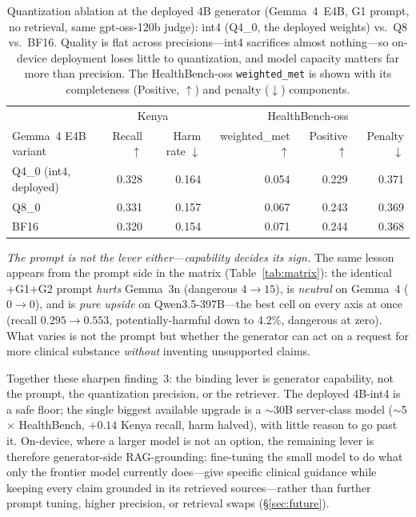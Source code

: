 \begin{table}[t]
\caption{Quantization ablation at the deployed 4B generator (Gemma~4~E4B, G1
prompt, no retrieval, same gpt-oss-120b judge): int4 (Q4\_0, the deployed
weights) vs.\ Q8 vs.\ BF16. Quality is flat across precisions---int4
sacrifices almost nothing---so on-device deployment loses little to
quantization, and model capacity matters far more than precision. The
HealthBench-oss \texttt{weighted\_met} is shown with its completeness
(Positive, $\uparrow$) and penalty ($\downarrow$) components.}
\label{tab:precision}
\centering
\small
\begin{tabular}{@{}lrrrrr@{}}
\toprule
 & \multicolumn{2}{c}{Kenya} & \multicolumn{3}{c}{HealthBench-oss} \\
\cmidrule(lr){2-3}\cmidrule(lr){4-6}
Gemma~4 E4B variant & \makecell{Recall\\$\uparrow$} & \makecell{Harm rate\\$\downarrow$} & \makecell{weighted\_met\\$\uparrow$} & \makecell{Positive\\$\uparrow$} & \makecell{Penalty\\$\downarrow$} \\
\midrule
Q4\_0 (int4, deployed) & 0.328 & 0.164 & 0.054 & 0.229 & 0.371 \\
Q8\_0 & 0.331 & 0.157 & 0.067 & 0.243 & 0.369 \\
BF16 & 0.320 & 0.154 & 0.071 & 0.244 & 0.368 \\
\bottomrule
\end{tabular}
\end{table}

\emph{The prompt is not the lever either---capability decides its sign.} The
same lesson appears from the prompt side in the matrix
(Table~\ref{tab:matrix}): the identical +G1+G2 prompt \emph{hurts} Gemma~3n
(dangerous $4\to15$), is \emph{neutral} on Gemma~4 ($0\to0$), and is
\emph{pure upside} on Qwen3.5-397B---the best cell on every axis at once (recall
$0.295\to0.553$, potentially-harmful down to 4.2\%, dangerous at zero). What
varies is not the prompt but whether the generator can act on a request for
more clinical substance \emph{without} inventing unsupported claims.

Together these sharpen finding~3: the binding lever is generator capability,
not the prompt, the quantization precision, or the retriever. The deployed
4B-int4 is a safe floor; the single biggest available upgrade is a $\sim$30B
server-class model ($\sim$5$\times$ HealthBench, $+0.14$ Kenya recall, harm
halved), with little reason to go past it. On-device, where a larger model is
not an option, the remaining lever is therefore generator-side
RAG-grounding: fine-tuning the small model to do what only the frontier model
currently does---give specific clinical guidance while keeping every claim
grounded in its retrieved sources---rather than further prompt tuning, higher
precision, or retrieval swaps (\S\ref{sec:future}).
